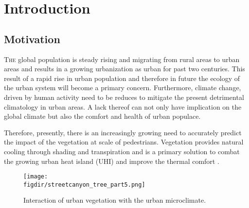 \chapter{Introduction}
\label{ch:introduction}

\def\figdir{chapters/ch01_introduction/figures}


%		

\section{Motivation}

\lettrine[lines=3,nindent=0em,loversize=0.1]{T}{he} global population is steady rising and migrating from rural areas to urban areas and results in a growing urbanization as urban for past two centuries. This result of a rapid rise in urban population and therefore in future the ecology of the urban system will become a primary concern. Furthermore, climate change, driven by human activity need to be reduces to mitigate the present detrimental climatology in urban areas. A lack thereof can not only have implication on the global climate but also the comfort and health of urban populace. 

Therefore, presently, there is an increasingly growing need to accurately predict the impact of the vegetation at scale of pedestrians. Vegetation provides natural cooling through shading and transpiration and is a primary solution to combat the growing urban heat island (UHI) and improve the thermal comfort  \citep{Gillner2015, Bowler2010, Loughner2012}. 

\begin{figure}[h]
	\centering
	\texttt{[image: \\figdir/streetcanyon\_tree\_part5.png]}
	\caption{Interaction of urban vegetation with the urban microclimate.}
	\label{fig:vegetation_fluxes}
\end{figure}

